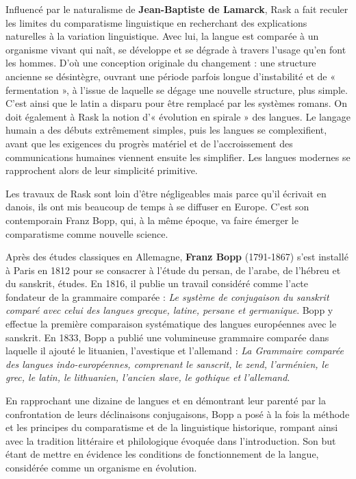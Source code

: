Influencé par le naturalisme de \textbf{Jean-Baptiste de Lamarck}, Rask a fait reculer les limites du comparatisme linguistique en recherchant des explications naturelles à la variation linguistique. Avec lui, la langue est comparée à un organisme vivant qui naît, se développe et se dégrade à travers l’usage qu’en font les hommes. D’où une conception originale du changement : une structure ancienne se désintègre, ouvrant une période parfois longue d’instabilité et de « fermentation », à l’issue de laquelle se dégage une nouvelle structure, plus simple. C’est ainsi que le latin a disparu pour être remplacé par les systèmes romans. On doit également à Rask la notion d’« évolution en spirale » des langues. Le langage humain a des débuts extrêmement simples, puis les langues se complexifient, avant que les exigences du progrès matériel et de l’accroissement des communications humaines viennent ensuite les simplifier. Les langues modernes se rapprochent alors de leur simplicité primitive.

Les travaux de Rask sont loin d’être négligeables mais parce qu’il écrivait en danois, ils ont mis beaucoup de temps à se diffuser en Europe. C’est son contemporain Franz Bopp, qui, à la même époque, va faire émerger le comparatisme comme nouvelle science.

Après des études classiques en Allemagne, \textbf{Franz Bopp} (1791-1867) s’est installé à Paris en 1812 pour se consacrer à l’étude du persan, de l’arabe, de l’hébreu et du sanskrit, études. En 1816, il publie un travail considéré comme l’acte fondateur de la grammaire comparée : \textit{Le système de conjugaison du sanskrit comparé avec celui des langues grecque, latine, persane et germanique}. Bopp y effectue la première comparaison systématique des langues européennes avec le sanskrit. En 1833, Bopp a publié une volumineuse grammaire comparée dans laquelle il ajouté le lituanien, l’avestique et l’allemand : \textit{La Grammaire comparée des langues indo-européennes, comprenant le sanscrit, le zend, l’arménien, le grec, le latin, le lithuanien, l’ancien slave, le gothique et l’allemand}.

En rapprochant une dizaine de langues et en démontrant leur parenté par la confrontation de leurs déclinaisons conjugaisons, Bopp a posé à la fois la méthode et les principes du comparatisme et de la linguistique historique, rompant ainsi avec la tradition littéraire et philologique évoquée dans l’introduction. Son but étant de mettre en évidence les conditions de fonctionnement de la langue, considérée comme un organisme en évolution.

